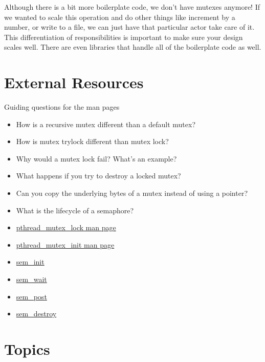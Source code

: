 Although there is a bit more boilerplate code, we don't have mutexes anymore!
If we wanted to scale this operation and do other things like increment by a number, or write to a file, we can just have that particular actor take care of it.
This differentiation of responsibilities is important to make sure your design scales well.
There are even libraries that handle all of the boilerplate code as well.

\section{External Resources}

Guiding questions for the man pages

\begin{itemize}
\item How is a recursive mutex different than a default mutex?
\item How is mutex trylock different than mutex lock?
\item Why would a mutex lock fail? What's an example?
\item What happens if you try to destroy a locked mutex?
\item Can you copy the underlying bytes of a mutex instead of using a pointer?
\item What is the lifecycle of a semaphore?
\end{itemize}

\begin{itemize}
\item \href{http://linux.die.net/man/3/pthread_mutex_lock}{pthread\_mutex\_lock man page}
\item \href{http://linux.die.net/man/3/pthread_mutex_init}{pthread\_mutex\_init man page}
\item \href{http://man7.org/linux/man-pages/man3/sem_init.3.html}{sem\_init}
\item \href{http://man7.org/linux/man-pages/man3/sem_wait.3.html}{sem\_wait}
\item \href{http://man7.org/linux/man-pages/man3/sem_post.3.html}{sem\_post}
\item \href{http://man7.org/linux/man-pages/man3/sem_destroy.3.html}{sem\_destroy}
\end{itemize}


\section{Topics}

